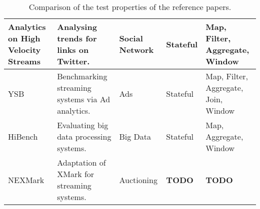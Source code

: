\begin{table}[H]
{\begin{tabular}{|p{3cm}|p{4cm}|p{3cm}|p{2.5cm}|p{2.5cm}|}
      Analytics on High Velocity Streams\cite{storm2}
      & Analysing trends for links on Twitter.
      & Social Network
      & Stateful
      & Map, Filter, Aggregate, Window
      \\\hline

      YSB\cite{ysb}
      & Benchmarking streaming systems via Ad analytics.
      & Ads
      & Stateful
      & Map, Filter, Aggregate, Join, Window
      \\\hline

      HiBench\cite{hibench}
      & Evaluating big data processing systems.
      & Big Data
      & Stateful
      & Map, Aggregate, Window
      \\\hline

      NEXMark\cite{nexmark}
      & Adaptation of XMark for streaming systems.
      & Auctioning
      & {\bfseries TODO}
      & {\bfseries TODO}
      \\\hline
    \end{tabular}
  }
  \caption{Comparison of the test properties of the reference papers.}
  \label{table:test-properties}
\end{table}

